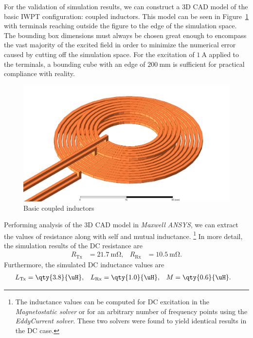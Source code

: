 \documentclass[11pt,a4paper,twoside,openany]{report}
\newcommand{\Tx}{\mathrm{Tx}}
\newcommand{\Rx}{\mathrm{Rx}}
\begin{document}
        For the validation of simulation results, we can construct a 3D CAD model of the basic IWPT configuration: coupled inductors. This model can be seen in Figure~\ref{fig:basic-coupled-inductors} with terminals reaching outside the figure to the edge of the simulation space. The bounding box dimensions must always be chosen great enough to encompass the vast majority of the excited field in order to minimize the numerical error caused by cutting off the simulation space. For the excitation of $\qty{1}{\A}$ applied to the terminals, a bounding cube with an edge of $\qty{200}{\mm}$ is sufficient for practical compliance with reality.
        \begin{figure}[!ht]
            \centering
            \includegraphics[width=.9\textwidth]{src/basic-coupled-inductors-isometric.png}
            \caption{\label{fig:basic-coupled-inductors}Basic coupled inductors}
        \end{figure}

        Performing analysis of the 3D CAD model in \emph{Maxwell ANSYS}, we can extract the values of resistance along with self and mutual inductance.%
            \footnote{The inductance values can be computed for DC excitation in the \emph{Magnetostatic solver} or for an arbitrary number of frequency points using the \emph{EddyCurrent solver}. These two solvers were found to yield identical results in the DC case.}
        In more detail, the simulation results of the DC resistance are
        \begin{align}
            \label{eq:dc-parameters-resistance-simulation}
            R_{\Tx} &= \qty{21.7}{\mohm},
        &
            R_{\Rx} &= \qty{10.5}{\mohm}.
        \end{align}
        Furthermore, the simulated DC inductance values are
        \begin{align}
        \label{eq:dc-parameters-inductance-simulation}
            L_{\Tx} &= \qty{3.8}{\uH},
        &
            L_{\Rx} &= \qty{1.0}{\uH},
        &
            M &= \qty{0.6}{\uH}.
        \end{align}
\end{document}
